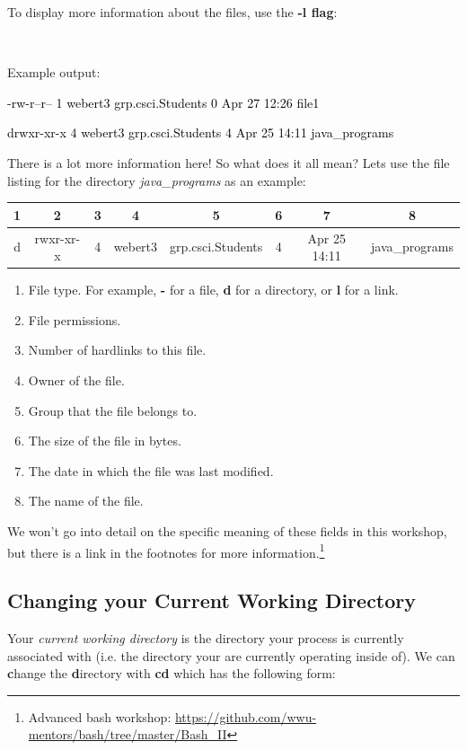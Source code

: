 \documentclass[oneside]{book}
\newcommand{\commandline}[1]{\begin{center} \colorbox{Dark}{\textcolor{white}{#1}} \end{center}}
\newcommand{\exampleout}[1]{\begin{center} \colorbox{Light}{\textcolor{black}{#1}} \end{center}}
\begin{document}
To display more information about the files, use the \textbf{-l flag}:

\commandline{ls -l}

Example output:
\exampleout{-rw-r--r-- 1 webert3 grp.csci.Students 0 Apr 27 12:26 file1}
\exampleout{drwxr-xr-x 4 webert3 grp.csci.Students 4 Apr 25 14:11 java\_programs}

There is a lot more information here! So what does it all mean? Lets use the file listing for the directory \textit{java\_programs} as an example:

\begin{center}
    \begin{tabular}{|c|c|c|c|c|c|c|c|}
        \hline
	    1 & 2 & 3 & 4 & 5 & 6 & 7 & 8 \\
	    \hline
        d & rwxr-xr-x & 4 & webert3 & grp.csci.Students & 4 & Apr 25 14:11 & java\_programs\\
        \hline
    \end{tabular}
\end{center}
	
\begin{enumerate}
    \item File type. For example, \textbf{-} for a file, \textbf{d} for a directory, or \textbf{l} for a link.
    \item File permissions. 
    \item Number of hardlinks to this file.
    \item Owner of the file.
    \item Group that the file belongs to.
    \item The size of the file in bytes.
    \item The date in which the file was last modified.
    \item The name of the file.
\end{enumerate}

We won't go into detail on the specific meaning of these fields in this workshop, but there is a link in the footnotes for more information.\footnote{Advanced bash workshop: \url{https://github.com/wwu-mentors/bash/tree/master/Bash_II}}

\subsection{Changing your Current Working Directory}
 Your \textit{current working directory} is the directory your process is currently associated with (i.e. the directory your are currently operating inside of). We can \textbf{c}hange the \textbf{d}irectory with \textbf{cd} which has the following form:
\end{document}
